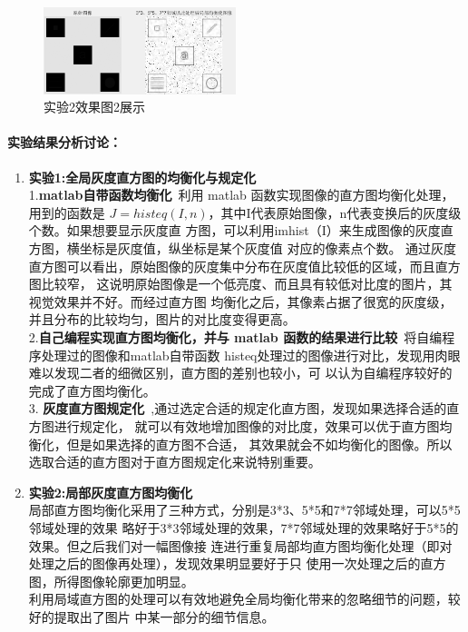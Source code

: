 \documentclass{ctexart}
\begin{document}
\begin{itemize}
\begin{figure}[htb]
    \centering
    \includegraphics[width=0.5\textwidth]{2_2.png}
    \caption{实验2效果图2展示}
    \end{figure}
\end{itemize}

\paragraph{\textbf{实验结果分析讨论：}} 
\begin{enumerate}
\item \textbf{实验1:全局灰度直方图的均衡化与规定化}\\
1.\textbf{matlab自带函数均衡化}~利用 matlab 函数实现图像的直方图均衡化处理，用到的函数是
$J = histeq(I,n)$，其中I代表原始图像，n代表变换后的灰度级个数。如果想要显示灰度直
方图，可以利用imhist（I）来生成图像的灰度直方图，横坐标是灰度值，纵坐标是某个灰度值
对应的像素点个数。
通过灰度直方图可以看出，原始图像的灰度集中分布在灰度值比较低的区域，而且直方图比较窄，
这说明原始图像是一个低亮度、而且具有较低对比度的图片，其视觉效果并不好。而经过直方图
均衡化之后，其像素占据了很宽的灰度级，并且分布的比较均匀，图片的对比度变得更高。\\
2.\textbf{自己编程实现直方图均衡化，并与 matlab 函数的结果进行比较}~将自编程序处理过的图像和matlab自带函数
histeq处理过的图像进行对比，发现用肉眼难以发现二者的细微区别，直方图的差别也较小，可
以认为自编程序较好的完成了直方图均衡化。\\
3. \textbf{灰度直方图规定化}~,通过选定合适的规定化直方图，发现如果选择合适的直方图进行规定化，
就可以有效地增加图像的对比度，效果可以优于直方图均衡化，但是如果选择的直方图不合适，
其效果就会不如均衡化的图像。所以选取合适的直方图对于直方图规定化来说特别重要。
\item \textbf{实验2:局部灰度直方图均衡化}\\
局部直方图均衡化采用了三种方式，分别是3*3、5*5和7*7邻域处理，可以5*5邻域处理的效果
略好于3*3邻域处理的效果，7*7邻域处理的效果略好于5*5的效果。但之后我们对一幅图像接
连进行重复局部均直方图均衡化处理（即对处理之后的图像再处理），发现效果明显要好于只
使用一次处理之后的直方图，所得图像轮廓更加明显。\\
利用局域直方图的处理可以有效地避免全局均衡化带来的忽略细节的问题，较好的提取出了图片
中某一部分的细节信息。
\end{enumerate}
\end{document}
